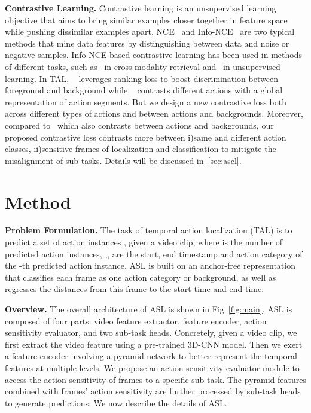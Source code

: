 \documentclass[10pt,twocolumn,letterpaper]{article}
\begin{document}
\par \textbf{Contrastive Learning.} Contrastive learning \cite{contra1,contra2,contra3} is an unsupervised learning objective that aims to bring similar examples closer together in feature space while pushing dissimilar examples apart. NCE~\cite{nce} and Info-NCE~\cite{infonce} are two typical methods that mine data features by distinguishing between data and noise or negative samples. Info-NCE-based contrastive learning has been used in methods of different tasks, such as~\cite{wang2022align,reler,Wang_2021_CVPR} in cross-modality retrieval and~\cite{moco,videomoco} in unsupervised learning.  In TAL, ~\cite{afsd} leverages ranking loss to boost discrimination between foreground and background while ~\cite{shi2022react} contrasts different actions with a global representation of action segments. But we design a new contrastive loss both across different types of actions and between actions and backgrounds. Moreover, compared to~\cite{shou2018autoloc} which also contrasts between actions and backgrounds, our proposed contrastive loss contrasts more between i)same and different action classes, ii)sensitive frames of localization and classification to mitigate the misalignment of sub-tasks. Details will be discussed in~\ref{sec:ascl}.

\vspace{1.0em}
\section{Method}
\textbf{Problem Formulation.}      
The task of temporal action localization (TAL) is to predict a set of action instances , given a video clip, where  is the number of predicted action instances, ,, are the start, end timestamp and action category of the -th predicted action instance. ASL is built on an anchor-free representation that classifies each frame as one action category or background, as well as regresses the distances from this frame to the start time and end time. 

\textbf{Overview.} 
The overall architecture of ASL is shown in Fig~\ref{fig:main}. 
ASL is composed of four parts: video feature extractor, feature encoder, action sensitivity evaluator, and two sub-task heads. 
Concretely, given a video clip, we first extract the video feature using a pre-trained 3D-CNN model. Then we exert a feature encoder involving a pyramid network to better represent the temporal features at multiple levels. We propose an action sensitivity evaluator module to access the action sensitivity of frames to a specific sub-task. The pyramid features combined with frames' action sensitivity are further processed by sub-task heads to generate predictions. We now describe the details of ASL.
\end{document}
